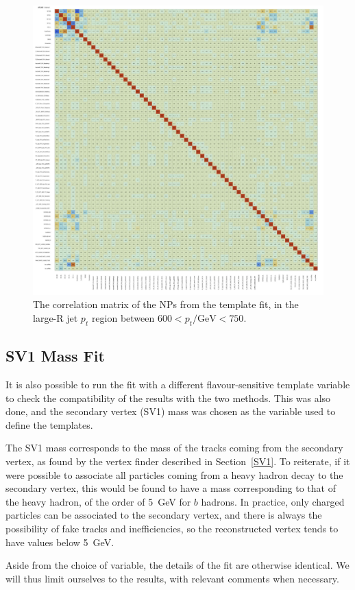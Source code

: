 \documentclass[10pt,a4paper]{book}
\begin{document}
\begin{figure}
    \centering
    \includegraphics[width=0.8\linewidth]{ftag/np_corr.png}
    \caption{The correlation matrix of the NPs from the template fit, in the large-R jet $p_t$ region between $600 < p_t/\text{GeV} < 750$.}
    \label{fig:correlation}
\end{figure}

\subsection{SV1 Mass Fit}
\label{sv1 fit}

It is also possible to run the fit with a different flavour-sensitive template variable to check the compatibility of the results with the two methods. This was also done, and the secondary vertex (SV1) mass was chosen as the variable used to define the templates.

The SV1 mass corresponds to the mass of the tracks coming from the secondary vertex, as found by the vertex finder described in Section~\ref{SV1}. To reiterate, if it were possible to associate all particles coming from a heavy hadron decay to the secondary vertex, this would be found to have a mass corresponding to that of the heavy hadron, of the order of 5~GeV for $b$ hadrons. In practice, only charged particles can be associated to the secondary vertex, and there is always the possibility of fake tracks and inefficiencies, so the reconstructed vertex tends to have values below 5~GeV. 

Aside from the choice of variable, the details of the fit are otherwise identical. We will thus limit ourselves to the results, with relevant comments when necessary.
\end{document}
